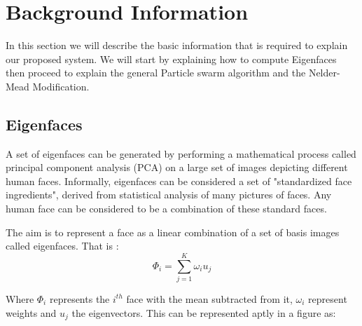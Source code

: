\documentclass[a4paper,twoside]{article}
\begin{document}
\section{Background Information}
\label{sec:section2}
In this section we will describe the basic information that is required to explain our proposed system.  We will start by explaining how to compute Eigenfaces then proceed to explain the general Particle swarm algorithm and the Nelder-Mead Modification. 

\subsection{Eigenfaces}
\label{facereg}
A set of eigenfaces \cite{Turk91} can be generated by performing a mathematical process called principal component analysis (PCA) on a large set of images depicting different human faces. Informally, eigenfaces can be considered a set of "standardized face ingredients", derived from statistical analysis of many pictures of faces. Any human face can be considered to be a combination of these standard faces.

 The aim is to represent a face as a linear combination of a set of basis images called eigenfaces. That is :
\begin{equation}
\Phi _i  = \sum\limits_{j = 1}^K {\omega _i u_j }
\end{equation}

Where $\Phi_i$ represents the $i^{th}$ face with the mean subtracted from it, $\omega _i$ represent weights and  $u_j$ the eigenvectors.
This can be represented aptly in a figure as:
\end{document}
